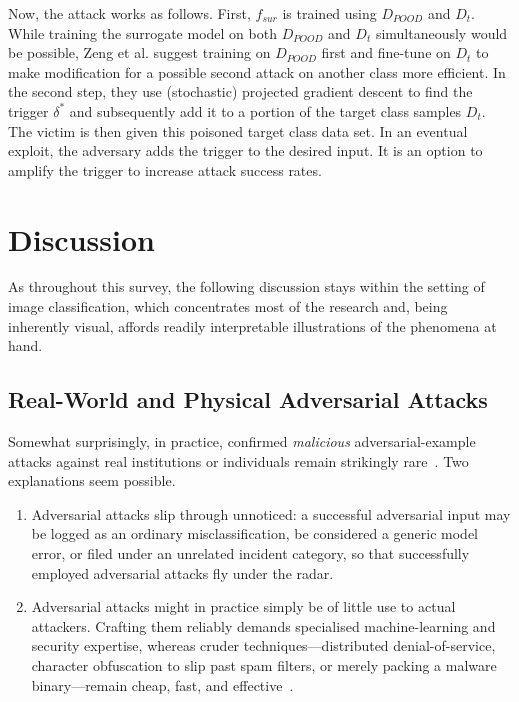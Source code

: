\documentclass[review]{AIM_report}
\begin{document}
Now, the attack works as follows. First, \(f_{sur}\) is trained using \(D_{POOD}\) and \(D_t\).
While training the surrogate model on both \(D_{POOD}\) and \(D_t\) simultaneously would be possible, Zeng et al. suggest training on \(D_{POOD}\) first and fine-tune on \(D_t\) to make modification for a possible second attack on another class more efficient.
In the second step, they use (stochastic) projected gradient descent to find the trigger \(\delta^{*}\) and subsequently add it to a portion of the target class samples \(D_t\).
The victim is then given this poisoned target class data set.
In an eventual exploit, the adversary adds the trigger to the desired input. It is an option to amplify the trigger to increase attack success rates.





\section{Discussion}
\label{sec:discussion}

As throughout this survey, the following discussion stays within the setting of image classification, which concentrates most of the research and, being inherently visual, affords readily interpretable illustrations of the phenomena at hand.

\subsection{Real-World and Physical Adversarial Attacks}

Somewhat surprisingly, in practice, confirmed \textit{malicious} adversarial-example attacks against real institutions or individuals remain strikingly rare~\cite{biggio2018wild, raff2023dont}. Two explanations seem possible. 

\begin{enumerate}
	\item Adversarial attacks slip through unnoticed: a successful adversarial input may be logged as an ordinary misclassification, be considered a generic model error, or filed under an unrelated incident category, so that successfully employed adversarial attacks fly under the radar.
	\item Adversarial attacks might in practice simply be of little use to actual attackers. Crafting them reliably demands specialised machine-learning and security expertise, whereas cruder techniques---distributed denial-of-service, character obfuscation to slip past spam filters, or merely packing a malware binary---remain cheap, fast, and effective~\cite{apruzzese2023real, raff2023dont}.
\end{enumerate}
\end{document}

